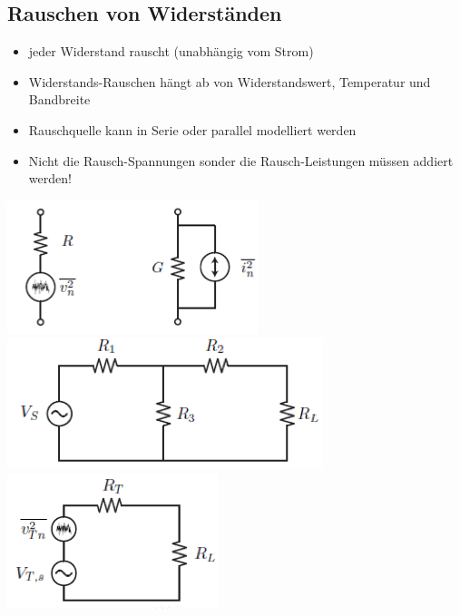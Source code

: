 \subsection{Rauschen von Widerständen}
\begin{itemize}
  \item jeder Widerstand rauscht (unabhängig vom Strom)
  \item Widerstands-Rauschen hängt ab von Widerstandswert, Temperatur und
  Bandbreite
  \item Rauschquelle kann in Serie oder parallel modelliert werden
  \item Nicht die Rausch-Spannungen sonder die Rausch-Leistungen müssen addiert
  werden!
\end{itemize}
\begin{minipage}{9cm}
\includegraphics[scale=0.6]{pictures/widerstandrauschen}\\
\includegraphics[scale=0.6]{pictures/seriewiderstand1}\\
\includegraphics[scale=0.6]{pictures/seriewiderstand2}
\end{minipage}
